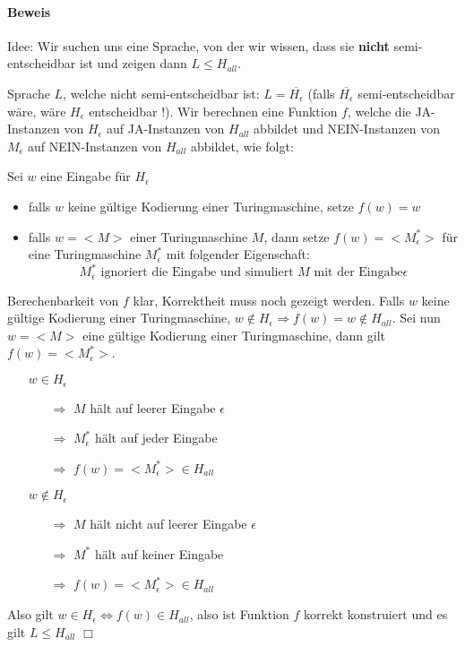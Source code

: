 \paragraph*{Beweis} Idee: Wir suchen uns eine Sprache, von der wir wissen, dass sie \textbf{nicht} semi-entscheidbar ist und zeigen dann $L \leq H_{all}$.

\para{} Sprache $L$, welche nicht semi-entscheidbar ist: $L=\overline{H_\epsilon}$ (falls $\overline{H_\epsilon}$ semi-entscheidbar wäre, wäre $H_\epsilon$ entscheidbar !). %
Wir berechnen eine Funktion $f$, welche die JA-Instanzen von $H_\epsilon$ auf JA-Instanzen von $H_{all}$ abbildet und NEIN-Instanzen von $M_\epsilon$ auf NEIN-Instanzen von $H_{all}$ abbildet, wie folgt:

\para{} Sei $w$ eine Eingabe für $H_\epsilon$
\begin{itemize}
	\item falls $w$ keine gültige Kodierung einer Turingmaschine, setze $f(w)=w$
	\item falls $w=<M>$ einer Turingmaschine $M$, dann setze $f(w)=<M_\epsilon^*>$ für eine Turingmaschine $M_\epsilon^*$ mit folgender Eigenschaft: $$ M_\epsilon^* \text{ ignoriert die Eingabe und simuliert } M \text{ mit der Eingabe} \epsilon $$
\end{itemize}
Berechenbarkeit von $f$ klar, Korrektheit muss noch gezeigt werden. Falls $w$ keine gültige Kodierung einer Turingmaschine, $w \not\in H_\epsilon \Rightarrow f(w)=w \not\in H_{all}$. Sei nun $w=<M>$ eine gültige Kodierung einer Turingmaschine, dann gilt $f(w)=<M_\epsilon^*>$.
\begin{itemize}
	\item[] $w \in H_\epsilon$
	\begin{itemize}
		\item[$\Rightarrow$] $M$ hält auf leerer Eingabe $\epsilon$
		\item[$\Rightarrow$] $M_\epsilon^*$ hält auf jeder Eingabe
		\item[$\Rightarrow$] $f(w)=<M_\epsilon^*> \in H_{all}$
	\end{itemize}
	\item[] $w \not\in H_\epsilon$
	\begin{itemize}
		\item[$\Rightarrow$] $M$ hält nicht auf leerer Eingabe $\epsilon$
		\item[$\Rightarrow$] $M^*$ hält auf keiner Eingabe
		\item[$\Rightarrow$] $f(w)=<M_\epsilon^*> \in H_{all}$
	\end{itemize}
\end{itemize}
Also gilt $w \in H_\epsilon \Leftrightarrow f(w) \in H_{all}$, also ist Funktion $f$ korrekt konstruiert und es gilt $L \leq H_{all}$ $\Box$ %